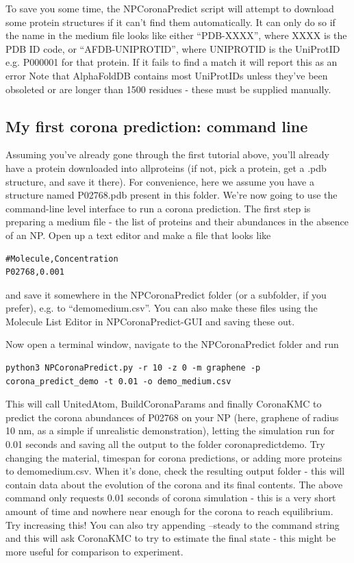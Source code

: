 \documentclass[10pt,a4paper,onecolumn]{report}
\begin{document}
To save you some time, the NPCoronaPredict script will attempt to download some protein structures if it can't find them automatically. It can only do so if the name in the medium file looks like either ``PDB-XXXX'', where XXXX is the PDB ID code, or ``AFDB-UNIPROTID'', where UNIPROTID is the UniProtID e.g. P000001 for that protein. If it fails to find a match it will report this as an error
Note that AlphaFoldDB contains most UniProtIDs unless they've been obsoleted or are longer than 1500 residues - these must be supplied manually. 
 

\subsection{My first corona prediction: command line} \label{section:firstCorona}
Assuming you've already gone through the first tutorial above, you'll already have a protein downloaded into all\textunderscore proteins (if not, pick a protein, get a .pdb structure, and save it there). For convenience, here we assume you have a structure named P02768.pdb present in this folder. We're now going to use the command-line level interface to run a corona prediction.
The first step is preparing a medium file - the list of proteins and their abundances in the absence of an NP. Open up a text editor and make a file that looks like

\begin{lstlisting}
#Molecule,Concentration
P02768,0.001
\end{lstlisting}
and save it somewhere in the NPCoronaPredict folder (or a subfolder, if you prefer), e.g. to ``demo\textunderscore medium.csv''. You can also make these files using the Molecule List Editor in NPCoronaPredict-GUI and saving these out.


 Now open a terminal window, navigate to the NPCoronaPredict folder and run

\begin{lstlisting}
python3 NPCoronaPredict.py -r 10 -z 0 -m graphene -p corona_predict_demo -t 0.01 -o demo_medium.csv
\end{lstlisting}
This will call UnitedAtom, BuildCoronaParams and finally CoronaKMC to predict the corona abundances of P02768 on your NP (here, graphene of radius 10 nm, as a simple if unrealistic demonstration), letting the simulation run for 0.01 seconds and saving all the output to the folder corona\textunderscore predict\textunderscore demo.  
Try changing the material, timespan for corona predictions, or adding more proteins to demo\textunderscore medium.csv. When it's done, check the resulting output folder - this will contain data about the evolution of the corona and its final contents.
The above command only requests 0.01 seconds of corona simulation - this is a very short amount of time and nowhere near enough for the corona to reach equilibrium. Try increasing this! You can also try appending --steady to the command string and this will ask CoronaKMC to try to estimate the final state - this might be more useful for comparison to experiment.
\end{document}
